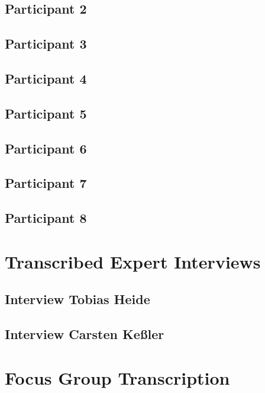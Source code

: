 \subsection{Participant 2}
  

\subsection{Participant 3}
  

\subsection{Participant 4}
  

\subsection{Participant 5}
  

\subsection{Participant 6}
  

\subsection{Participant 7}
  
  
\subsection{Participant 8}
  

\section{Transcribed Expert Interviews}

\subsection{Interview Tobias Heide}
  

\subsection{Interview Carsten Ke{\ss}ler}
  
  
\section{Focus Group Transcription}
  
  